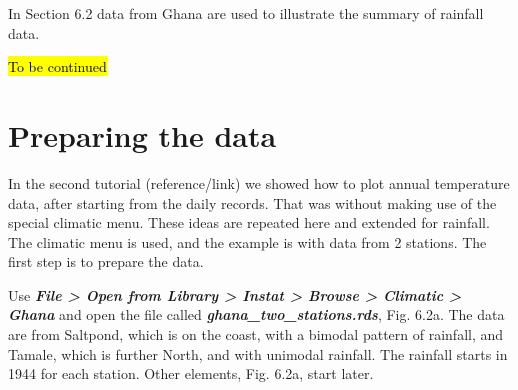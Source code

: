 \documentclass[
  letterpaper,
  DIV=11,
  numbers=noendperiod]{scrreprt}
\begin{document}
In Section 6.2 data from Ghana are used to illustrate the summary of
rainfall data.

\hl{To be continued}

\section{Preparing the data}\label{preparing-the-data}

In the second tutorial (reference/link) we showed how to plot annual
temperature data, after starting from the daily records. That was
without making use of the special climatic menu. These ideas are
repeated here and extended for rainfall. The climatic menu is used, and
the example is with data from 2 stations. The first step is to prepare
the data.

Use \textbf{\emph{File \textgreater{} Open from Library \textgreater{}
Instat \textgreater{} Browse \textgreater{} Climatic \textgreater{}
Ghana}} and open the file called
\textbf{\emph{ghana\_two\_stations.rds}}, Fig. 6.2a. The data are from
Saltpond, which is on the coast, with a bimodal pattern of rainfall, and
Tamale, which is further North, and with unimodal rainfall. The rainfall
starts in 1944 for each station. Other elements, Fig. 6.2a, start later.
\end{document}
